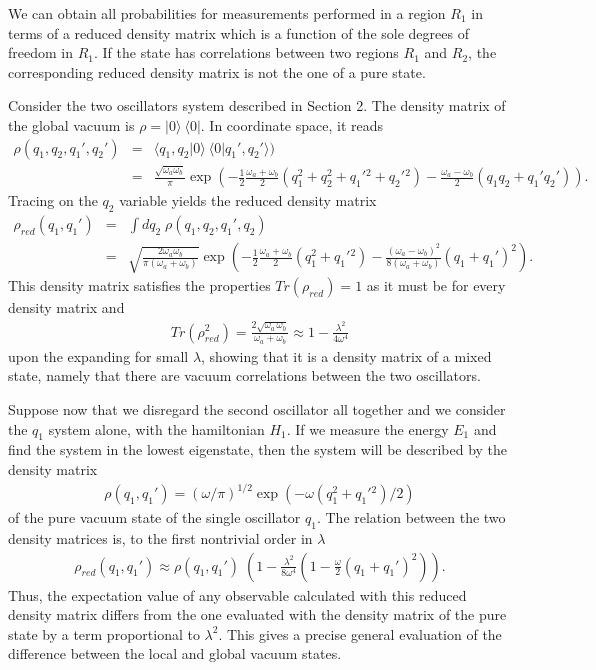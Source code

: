 \documentclass[10pt, nofootinbib]{revtex4}
\newcommand{\bea}{\begin{eqnarray}}
\newcommand{\eea}{\end{eqnarray}}
\begin{document}
We can obtain all probabilities for measurements performed in a region
$R_{1}$ in terms of a reduced density matrix which is a function of the
sole degrees of freedom in $R_{1}$.  If the state has correlations
between two regions $R_{1}$ and $R_{2}$, the corresponding reduced
density matrix is not the one of a pure state.

Consider the two oscillators system described in Section 2.  The
density matrix of the global vacuum is $\rho=|0\rangle\ \langle 0|$. 
In coordinate space, it reads
%
\bea
\rho(q_1,q_2,q_1',q_2') &=& \langle 
q_1,q_2|0\rangle\ \langle 0|q_1',q_2'\rangle) \\
&=& \frac{\sqrt{\omega_a \omega_b}}{{\pi}} \exp \left( 
-\frac{1}{2}\frac{\omega_a + \omega_b}{2} 
(q_1^2+q_2^2+q_1'{}^2+q_2'{}^2) -\frac{\omega_a  - \omega_b}{2} (q_1 q_2 
+q_1' q_2') \right).\nonumber
\eea
%
Tracing on the $q_{2}$ variable yields the reduced density matrix
%
\bea
\rho_{red} (q_1,q_1') &=& \int dq_2 \; \rho(q_1,q_2,q_1',q_2) \\
&=&  \sqrt{\frac{2\omega_a \omega_b}{\pi (\omega_a + \omega_b)}} \exp 
\left( -\frac{1}{2}\frac{\omega_a  + \omega_b}{2} (q_1^2+q_1'{}^2) 
-\frac{(\omega_a  - \omega_b)^2}{8 (\omega_a + \omega_b)} (q_1  +q_1' 
)^2 \right).
\eea
%
This density matrix satisfies the properties $Tr(\rho_{red})=1$ as it 
must be for every density matrix and
%
\bea
Tr(\rho_{red}^2) =  \frac{2\sqrt{\omega_a \, \omega_b}}{\omega_a + 
\omega_b} \approx 1 -\frac{\lambda^2}{4 \omega^4}
\eea
%
upon the expanding for small $\lambda$, showing that it is a density
matrix of a mixed state, namely that there are vacuum correlations
between the two oscillators.  

Suppose now that we disregard the second oscillator all together and we
consider the $q_{1}$ system alone, with the hamiltonian $H_{1}$.  If 
we measure the energy $E_{1}$ and find the system in the lowest 
eigenstate, then the system will be described by the 
density matrix 
%
\bea
\rho(q_1,q_1')=
(\omega/\pi)^{1/2} \exp \left( -\omega (q_1^2+q_1'{}^ 2)/2\right)
\eea
%
of the pure vacuum state of the single oscillator $q_1$.  The relation
between the two density matrices is, to the first nontrivial order in
$\lambda$
%
\bea
\rho_{red} (q_1,q_1') \approx \rho (q_1,q_1') \; \left(1 - 
\frac{\lambda^2}{8 \omega^4}\left(1-\frac{\omega}{2}(q_1+q_1')^2 
\right) \right).
\eea
%
Thus, the expectation value of any observable calculated with this
reduced density matrix differs from the one evaluated with the density
matrix of the pure state by a term proportional to $\lambda^2$.  This
gives a precise general evaluation of the difference between the 
local and global vacuum states. 
\end{document}
